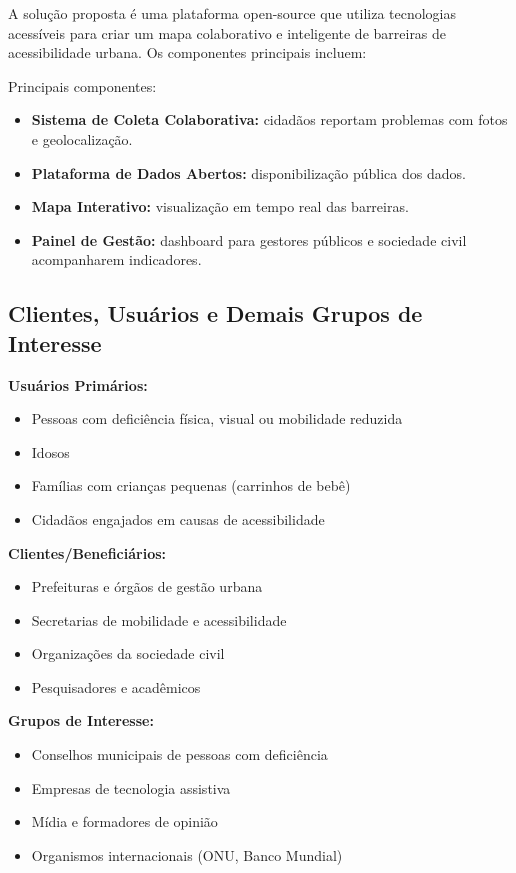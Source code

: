 \documentclass[12pt,a4paper]{article}
\begin{document}
A solução proposta é uma plataforma open-source que utiliza tecnologias acessíveis para criar um mapa colaborativo e inteligente de barreiras de acessibilidade urbana. Os componentes principais incluem:

Principais componentes:
\begin{itemize}
    \item \textbf{Sistema de Coleta Colaborativa:} cidadãos reportam problemas com fotos e geolocalização.
    \item \textbf{Plataforma de Dados Abertos:} disponibilização pública dos dados.
    \item \textbf{Mapa Interativo:} visualização em tempo real das barreiras.
    \item \textbf{Painel de Gestão:} dashboard para gestores públicos e sociedade civil acompanharem indicadores.
\end{itemize}

\subsection{Clientes, Usuários e Demais Grupos de Interesse}
\label{subsec:clientes-usuarios}

\textbf{Usuários Primários:}
\begin{itemize}
    \item Pessoas com deficiência física, visual ou mobilidade reduzida
    \item Idosos
    \item Famílias com crianças pequenas (carrinhos de bebê)
    \item Cidadãos engajados em causas de acessibilidade
\end{itemize}

\textbf{Clientes/Beneficiários:}
\begin{itemize}
    \item Prefeituras e órgãos de gestão urbana
    \item Secretarias de mobilidade e acessibilidade
    \item Organizações da sociedade civil
    \item Pesquisadores e acadêmicos
\end{itemize}

\textbf{Grupos de Interesse:}
\begin{itemize}
    \item Conselhos municipais de pessoas com deficiência
    \item Empresas de tecnologia assistiva
    \item Mídia e formadores de opinião
    \item Organismos internacionais (ONU, Banco Mundial)
\end{itemize}
\end{document}
